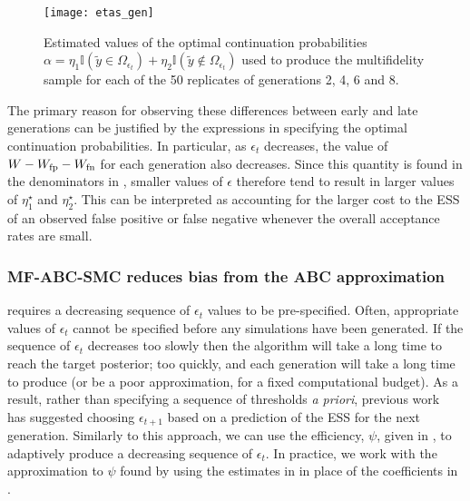 \documentclass[review,demo]{siamonline190516}
\begin{document}
\begin{figure}
\centering
\texttt{[image: etas\_gen]}
\caption{
Estimated values of the optimal continuation probabilities $\alpha = \eta_1 \mathbb I(\tilde y \in \Omega_{\epsilon_t}) + \eta_2 \mathbb I(\tilde y \notin \Omega_{\epsilon_t})$ used to produce the multifidelity sample for each of the 50 replicates of generations 2, 4, 6 and 8.
}
\label{fig:etas}
\end{figure}

The primary reason for observing these differences between early and late generations can be justified by the expressions in  specifying the optimal continuation probabilities.
In particular, as $\epsilon_t$ decreases, the value of $W - W_{\mathrm{fp}} - W_{\mathrm{fn}}$ for each generation also decreases.
Since this quantity is found in the denominators in , smaller values of $\epsilon$ therefore tend to result in larger values of $\eta_1^\star$ and $\eta_2^\star$.
This can be interpreted as accounting for the larger cost to the ESS of an observed false positive or false negative whenever the overall acceptance rates are small.

\subsubsection{MF-ABC-SMC reduces bias from the ABC approximation}
\label{s:Adaptive}

 requires a decreasing sequence of $\epsilon_t$ values to be pre-specified.
Often, appropriate values of $\epsilon_t$ cannot be specified before any simulations have been generated.
If the sequence of $\epsilon_t$ decreases too slowly then the algorithm will take a long time to reach the target posterior; too quickly, and each generation will take a long time to produce (or be a poor approximation, for a fixed computational budget).
As a result, rather than specifying a sequence of thresholds \emph{a priori}, previous work~\cite{DelMoral2012} has suggested choosing $\epsilon_{t+1}$ based on a prediction of the ESS for the next generation.
Similarly to this approach, we can use the efficiency, $\psi$, given in , to adaptively produce a decreasing sequence of $\epsilon_t$.
In practice, we work with the approximation to $\psi$ found by using the estimates in  in place of the coefficients in .
\end{document}
